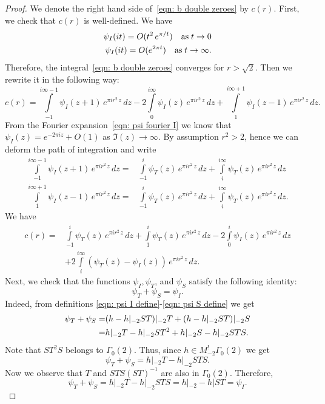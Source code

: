   \begin{proof}
  We denote the right hand side of~\eqref{eqn: b double zeroes} by $c(r)$. First, we check that $c(r)$ is well-defined. We have
  \begin{align}
  \psi_I(it)=O(t^{2}\,e^{\pi/t})\quad\mbox{as}\;t\to 0\notag\\
   \psi_I(it)=O(e^{2\pi t})\quad\mbox{as}\;t\to\infty.\notag
  \end{align}
  Therefore, the integral~\eqref{eqn: b double zeroes} converges for $r>\sqrt{2}$.
  Then we rewrite it in the following way:
  $$c(r)=\int\limits_{-1}^{i\infty-1}\psi_I(z+1)\,e^{\pi i r^2 \,z}\,dz-2\int\limits_{0}^{i\infty}\psi_I(z)\,e^{\pi i r^2 \,z}\,dz+
  \int\limits_{1}^{i\infty+1}\psi_I(z-1)\,e^{\pi i r^2 \,z}\,dz.$$
  From the Fourier expansion~\eqref{eqn: psi fourier I} we know that $\psi_I(z)=e^{-2\pi i z}+O(1)$ as $\Im(z)\to\infty$.
  By assumption $r^2>2$, hence we can deform the path of integration and write
  \begin{align}\label{eqn: inside proof 1}
  \int\limits_{-1}^{i\infty-1}\psi_I(z+1)\,e^{\pi i r^2 \,z}\,dz=&
  \int\limits_{-1}^{i}\psi_T(z)\,e^{\pi i r^2 \,z}\,dz+\int\limits_{i}^{i\infty}\psi_T(z)\,e^{\pi i r^2 \,z}\,dz\\
  \int\limits_{1}^{i\infty+1}\psi_I(z-1)\,e^{\pi i r^2 \,z}\,dz=&
  \int\limits_{-1}^{i}\psi_T(z)\,e^{\pi i r^2 \,z}\,dz+\int\limits_{i}^{i\infty}\psi_T(z)\,e^{\pi i r^2 \,z}\,dz.
  \end{align}
  We have
  \begin{align}\label{eqn: c1}c(r)=&\int\limits_{-1}^{i}\psi_T(z)\,e^{\pi i r^2 \,z}\,dz+\int\limits_{1}^{i}\psi_T(z)\,e^{\pi i r^2 \,z}\,dz
  -2\int\limits_{0}^{i}\psi_I(z)\,e^{\pi i r^2 \,z}\,dz\\
  &+2\int\limits_{i}^{i\infty}(\psi_T(z)-\psi_I(z))\,e^{\pi i r^2 \,z}\,dz.\nonumber
   \end{align}
  Next, we check that the functions $\psi_I,\psi_T$, and $\psi_S$ satisfy the following identity:
  \begin{equation}\label{eqn: c2}\psi_T+\psi_S=\psi_I.\end{equation}
  Indeed, from definitions \eqref{eqn: psi I define}-\eqref{eqn: psi S define} we get
  \begin{align}\psi_T+\psi_S=&(h-h|_{-2}ST)|_{-2}T+(h-h|_{-2}ST)|_{-2}S\notag\\
  =&h|_{-2}T-h|_{-2}ST^2+h|_{-2}S-h|_{-2}STS.\notag\end{align}
  Note that $ST^2S$ belongs to $\Gamma_0(2)$. Thus, since $h\in M^!_{-2}\Gamma_0(2)$ we get
  $$\psi_T+\psi_S=h|_{-2}T-h|_{-2}STS. $$
  Now we observe that $T$ and $STS(ST)^{-1}$ are also in $\Gamma_0(2)$. Therefore,
  $$\psi_T+\psi_S=h|_{-2}T-h|_{-2}STS=h|_{-2}-h|ST=\psi_I.$$


\end{proof}

